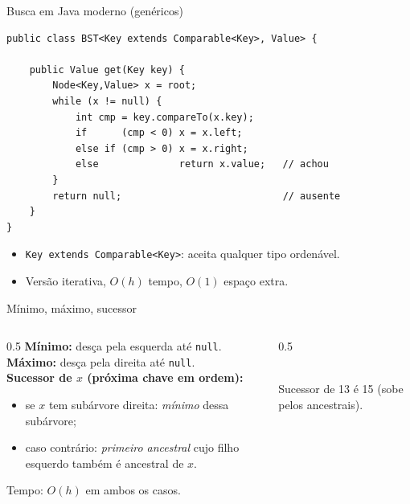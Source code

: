 \documentclass[aspectratio=169]{beamer}
\begin{document}
\begin{frame}[fragile]{Busca em Java moderno (genéricos)}
\begin{lstlisting}
public class BST<Key extends Comparable<Key>, Value> {

    public Value get(Key key) {
        Node<Key,Value> x = root;
        while (x != null) {
            int cmp = key.compareTo(x.key);
            if      (cmp < 0) x = x.left;
            else if (cmp > 0) x = x.right;
            else              return x.value;   // achou
        }
        return null;                            // ausente
    }
}
\end{lstlisting}
\begin{itemize}
  \item \texttt{Key extends Comparable<Key>}: aceita qualquer tipo ordenável.
  \item Versão iterativa, $O(h)$ tempo, $O(1)$ espaço extra.
\end{itemize}
\end{frame}

\begin{frame}{Mínimo, máximo, sucessor}
\begin{columns}[T]
\begin{column}{0.5\textwidth}
\textbf{Mínimo:} desça pela esquerda até \texttt{null}.\\[2pt]
\textbf{Máximo:} desça pela direita até \texttt{null}.\\[6pt]
\textbf{Sucessor de $x$ (próxima chave em ordem):}
\begin{itemize}
  \item se $x$ tem subárvore direita: \emph{mínimo} dessa subárvore;
  \item caso contrário: \emph{primeiro ancestral} cujo filho esquerdo também é ancestral de $x$.
\end{itemize}
Tempo: $O(h)$ em ambos os casos.
\end{column}
\begin{column}{0.5\textwidth}
\centering
{}\\[2pt]
\small Sucessor de 13 é 15 (sobe pelos ancestrais).
\end{column}
\end{columns}
\end{frame}
\end{document}
